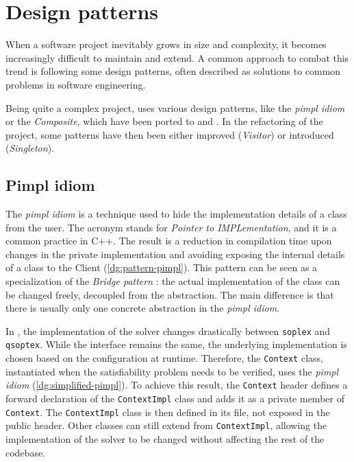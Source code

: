 \section{Design patterns}
\label{sec:patterns}

When a software project inevitably grows in size and complexity, it becomes increasingly difficult to maintain and extend.
A common approach to combat this trend is following some design patterns, often described as solutions to common problems in software engineering.

Being quite a complex project, \dreal uses various design patterns, like the \textit{pimpl idiom} or the \textit{Composite}, which have been ported to \dlinearfour and \dlinear.
In the refactoring of the project, some patterns have then been either improved (\textit{Visitor}) or introduced (\textit{Singleton}).

\subsection*{Pimpl idiom}

The \textit{pimpl idiom} \cite{man:pimpl} is a technique used to hide the implementation details of a class from the user.
The acronym stands for \textit{Pointer to IMPLementation}, and it is a common practice in C++.
The result is a reduction in compilation time upon changes in the private implementation and avoiding exposing the internal details of a class to the Client (\autoref{dg:pattern-pimpl}).
This pattern can be seen as a specialization of the \textit{Bridge pattern} \cite{book:gof}: the actual implementation of the class can be changed freely, decoupled from the abstraction.
The main difference is that there is usually only one concrete abstraction in the \textit{pimpl idiom}.


In \dlinear, the implementation of the solver changes drastically between \texttt{soplex} and \texttt{qsoptex}.
While the interface remains the same, the underlying implementation is chosen based on the configuration at runtime.
Therefore, the \texttt{Context} class, instantiated when the satisfiability problem needs to be verified, uses the \textit{pimpl idiom} (\autoref{dg:simplified-pimpl}).
To achieve this result, the \texttt{Context} header defines a forward declaration of the \texttt{ContextImpl} class and adds it as a private member of \texttt{Context}.
The \texttt{ContextImpl} class is then defined in its file, not exposed in the public header.
Other classes can still extend from \texttt{ContextImpl}, allowing the implementation of the solver to be changed without affecting the rest of the codebase.

